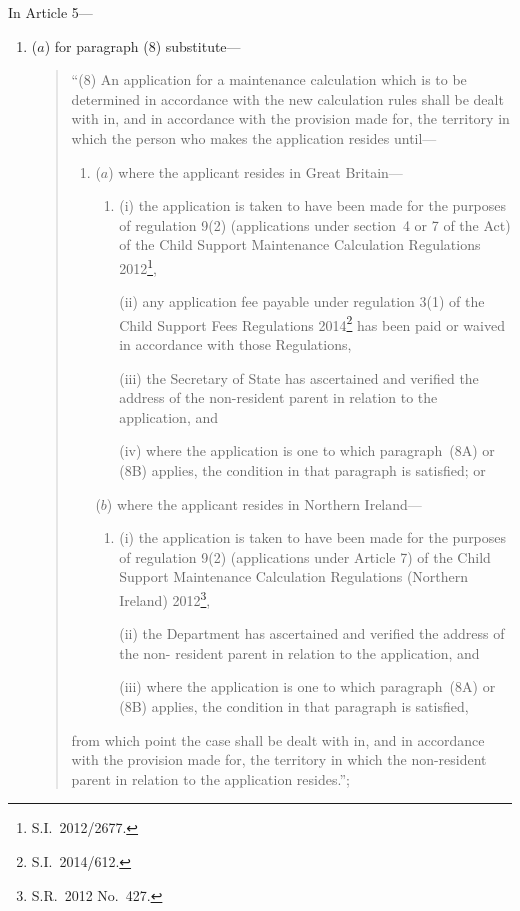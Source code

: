\documentclass[12pt,a4paper]{article}
\begin{document}
In Article 5---
\begin{enumerate}\item[]
($a$) for paragraph (8) substitute---
\begin{quotation}
``(8) An application for a maintenance calculation which is to be determined in
accordance with the new calculation rules shall be dealt with in, and in accordance
with the provision made for, the territory in which the person who makes the
application resides until---
\begin{enumerate}\item[]
($a$) where the applicant resides in Great Britain---
\begin{enumerate}\item[]
(i) the application is taken to have been made for the purposes of
regulation 9(2) (applications under section~4 or 7 of the Act) of the
Child Support Maintenance Calculation Regulations 2012\footnote{S.I.~2012/2677.},

(ii) any application fee payable under regulation 3(1) of the Child Support Fees Regulations 2014\footnote{S.I.~2014/612.} has been paid or waived in accordance with those Regulations,

(iii) the Secretary of State has ascertained and verified the address of the
non-resident parent in relation to the application, and

\begin{sloppypar}
(iv) where the application is one to which paragraph~(8A) or (8B) applies,
the condition in that paragraph is satisfied; or
\end{sloppypar}
\end{enumerate}

($b$) where the applicant resides in Northern Ireland---
\begin{enumerate}\item[]
(i) the application is taken to have been made for the purposes of
regulation 9(2) (applications under Article 7) of the Child Support
Maintenance Calculation Regulations (Northern Ireland) 2012\footnote{S.R.~2012 No.~427.},

(ii) the Department has ascertained and verified the address of the non-%
resident parent in relation to the application, and

\begin{sloppypar}
(iii) where the application is one to which paragraph~(8A) or (8B) applies,
the condition in that paragraph is satisfied,
\end{sloppypar}
\end{enumerate}
\end{enumerate}
from which point the case shall be dealt with in, and in accordance with the
provision made for, the territory in which the non-resident parent in relation to the 
application resides.'';
\end{quotation}


\end{enumerate}
\end{document}
